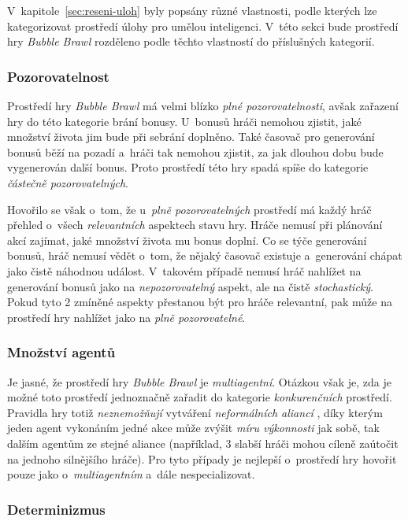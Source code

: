 V~kapitole~\ref{sec:reseni-uloh} byly popsány různé vlastnosti, podle kterých lze kategorizovat prostředí úlohy pro umělou inteligenci. V~této sekci bude prostředí hry \emph{Bubble Brawl} rozděleno podle těchto vlastností do příslušných kategorií.

\subsubsection*{Pozorovatelnost}

Prostředí hry \emph{Bubble Brawl} má velmi blízko \emph{plné pozorovatelnosti}, avšak zařazení hry do této kategorie brání bonusy. U~bonusů hráči nemohou zjistit, jaké množství života jim bude při sebrání doplněno. Také časovač pro generování bonusů běží na pozadí a~hráči tak nemohou zjistit, za jak dlouhou dobu bude vygenerován další bonus. Proto prostředí této hry spadá spíše do kategorie \emph{částečně pozorovatelných}.

Hovořilo se však o~tom, že u~\emph{plně pozorovatelných} prostředí má každý hráč přehled o~všech \emph{relevantních} aspektech stavu hry. Hráče nemusí při plánování akcí zajímat, jaké množství života mu bonus doplní. Co se týče generování bonusů, hráč nemusí vědět o~tom, že nějaký časovač existuje a~generování chápat jako čistě náhodnou událost. V~takovém případě nemusí hráč nahlížet na generování bonusů jako na \emph{nepozorovatelný} aspekt, ale na čistě \emph{stochastický}. Pokud tyto 2 zmíněné aspekty přestanou být pro hráče relevantní, pak může na prostředí hry nahlížet jako na \emph{plně pozorovatelné}.

\subsubsection*{Množství agentů}

Je jasné, že prostředí hry \emph{Bubble Brawl} je \emph{multiagentní}. Otázkou však je, zda je možné toto prostředí jednoznačně zařadit do kategorie \emph{konkurenčních} prostředí. Pravidla hry totiž \emph{neznemožňují} vytváření \emph{neformálních aliancí} \cite[s.\,166]{AI_Russel_Norvig}, díky kterým jeden agent vykonáním jedné akce může zvýšit \emph{míru výkonnosti} jak sobě, tak dalším agentům ze stejné aliance (například, 3 slabší hráči mohou cíleně zaútočit na jednoho silnějšího hráče). Pro tyto případy je nejlepší o~prostředí hry hovořit pouze jako o~\emph{multiagentním} a~dále nespecializovat.

\subsubsection*{Determinizmus}

